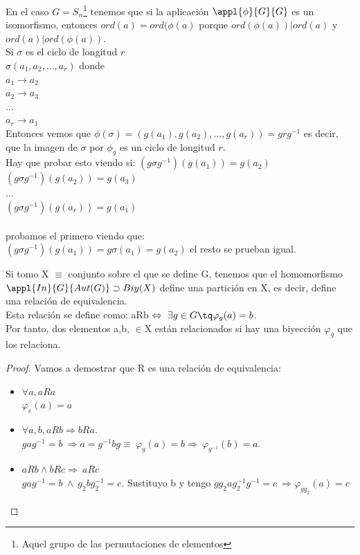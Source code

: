 \documentclass{apuntes}
\begin{document}
\begin{example}
En el caso $G = S_n$\footnote{Aquel grupo de las permutaciones de elementos}
tenemos que si la aplicación $\appl{\phi}{G}{G}$ es un isomorfismo, entonces $ord(a) = ord(\phi (a)$ porque $ord(\phi (a)) | ord(a)$ y $ord(a) | ord(\phi (a))$.\\
Si $\sigma$ es el ciclo de longitud $r$\\
$\sigma(a_1, a_2, \hdots, a_r)$ donde \\
$a_1 \longrightarrow a_2$\\
$a_2 \longrightarrow a_3$\\
$\hdots$\\
$a_r \longrightarrow a_1$\\

Entonces vemos que $\phi (\sigma) = (g(a_1), g(a_2), \hdots, g(a_r)) = grg^{-1}$
es decir, que la imagen de $\sigma$ por $\phi _g$ es un ciclo de longitud $r$.\\

Hay que probar esto viendo si:
$(g\sigma g^{-1})(g(a_1)) = g(a_2)$\\
$(g\sigma g^{-1})(g(a_2)) = g(a_3)$\\
$\hdots$\\
$(g\sigma g^{-1})(g(a_r)) = g(a_1)$\\
\\
probamos el primero viendo que: \\
$(g\sigma g^{-1})(g(a_1)) = g\sigma(a_1) = g(a_2)$
el resto se prueban igual.
\end{example}

Si tomo X $\equiv$ conjunto sobre el que se define G, tenemos que el homomorfismo $\appl{In}{G}{Aut(G)}\supset Biy(X)$  define
una partición en X, es decir, define una relación de equivalencia.\\
Esta relación se define como: aRb $\Leftrightarrow \ \exists g \in G \tq \varphi_{g}(a)=b$.\\
Por tanto, dos elementos a,b, $\in$X están relacionados si hay una biyección $\varphi_{g}$  que los relaciona.\\
\begin{proof}
 Vamos a demostrar que R es una relación de equivalencia:\\
 \begin{itemize}
  \item $\forall  a, aRa$ \\ 
    $\varphi_{e}(a)=a$
  \item $\forall a,b, aRb\Rightarrow bRa.$\\
    $gag^{-1}=b \ \Rightarrow a=g^{-1}bg \equiv \ \varphi_{g}(a)=b\Rightarrow \ \varphi_{g^{-1}}(b)=a$.
  \item $aRb \wedge bRc \Rightarrow \ aRc$\\
    $gag^{-1}=b \ \wedge \ g_{2}bg_{2}^{-1}=c$. Sustituyo b y tengo $gg_{2}ag_{2}^{-1}g^{-1}=c\ \Rightarrow \varphi_{gg_{2}}(a)=c$
 \end{itemize}
\end{proof}
\end{document}
